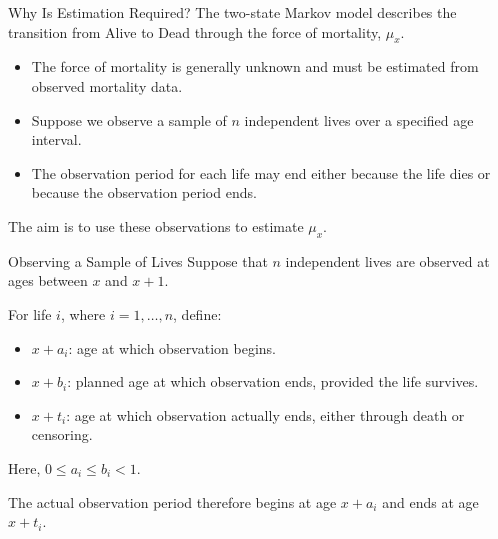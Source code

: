 \documentclass[
  ignorenonframetext,
  aspectratio=169,
]{beamer}
\providecommand{\tightlist}{%
  \setlength{\itemsep}{0pt}\setlength{\parskip}{0pt}}
\begin{document}
\begin{frame}{Why Is Estimation Required?}
\protect{}\label{why-is-estimation-required}
The two-state Markov model describes the transition from Alive to Dead
through the force of mortality, \(\mu_x\).

\begin{itemize}
\tightlist
\item
  The force of mortality is generally unknown and must be estimated from
  observed mortality data.
\item
  Suppose we observe a sample of \(n\) independent lives over a
  specified age interval.
\item
  The observation period for each life may end either because the life
  dies or because the observation period ends.
\end{itemize}

The aim is to use these observations to estimate \(\mu_x\).
\end{frame}

\begin{frame}{Observing a Sample of Lives}
\protect{}\label{observing-a-sample-of-lives}
Suppose that \(n\) independent lives are observed at ages between \(x\)
and \(x+1\).

For life \(i\), where \(i=1,\ldots,n\), define:

\begin{itemize}
\tightlist
\item
  \(x+a_i\): age at which observation begins.
\item
  \(x+b_i\): planned age at which observation ends, provided the life
  survives.
\item
  \(x+t_i\): age at which observation actually ends, either through
  death or censoring.
\end{itemize}

Here, \(0\leq a_i\leq b_i<1\).

The actual observation period therefore begins at age \(x+a_i\) and ends
at age \(x+t_i\).
\end{frame}
\end{document}
